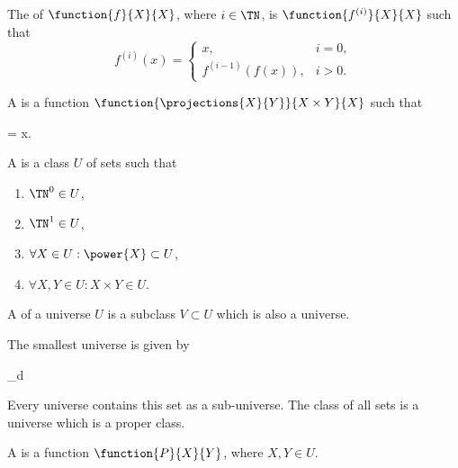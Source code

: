\documentclass[b5paper, english, oneside]{memoir}
\begin{document}
\begin{definition}[Iteration]
The  of $\function{f}{X}{X}$, where $i \in \TN$, is $\function{f^{(i)}}{X}{X}$ such that
\begin{equation}
f^{(i)}(x) =
\begin{cases}
x, & i = 0, \\
f^{(i - 1)}(f(x)), & i > 0.
\end{cases} 
\end{equation}
\end{definition}

\begin{definition}[Projection]
A  is a function $\function{\projections{X}{Y}}{X \times Y}{X}$ such that
\begin{eqs}
 = x.
\end{eqs}
\end{definition}

\begin{definition}[Universe]
A  is a class $U$ of sets such that
\begin{enumerate}
\item $\TN^0 \in U$,
\item $\TN^1 \in U$,
\item $\forall X \in U: \power{X} \subset U$,
\item $\forall X, Y \in U: X \times Y \in U$.
\end{enumerate}
\end{definition}

\begin{definition}
A  of a universe $U$ is a subclass $V \subset U$ which is also a universe. 
\end{definition}

\begin{example}
The smallest universe is given by
\begin{eqs}
\bigcup_{d \in \TN}  
\end{eqs}
Every universe contains this set as a sub-universe. The class of all sets is a universe which is a proper class.
\end{example}

\begin{definition}
A  is a function $\function{P}{X}{Y}$, where $X, Y \in U$. 
\end{definition}
\end{document}
